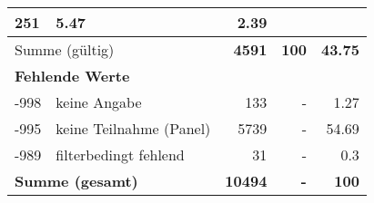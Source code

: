 \begin{longtable}{lXrrr}
       \num{251} &
       \num[round-mode=places,round-precision=2]{5,47} &
         \num[round-mode=places,round-precision=2]{2,39} \\
     \midrule
     \multicolumn{2}{l}{Summe (gültig)} &
       \textbf{\num{4591}} &
     \textbf{100} &
       \textbf{\num[round-mode=places,round-precision=2]{43,75}} \\
     \multicolumn{5}{l}{\textbf{Fehlende Werte}}\\
       -998 &
       keine Angabe &
         \num{133} &
        - &
         \num[round-mode=places,round-precision=2]{1,27} \\
       -995 &
       keine Teilnahme (Panel) &
         \num{5739} &
        - &
         \num[round-mode=places,round-precision=2]{54,69} \\
       -989 &
       filterbedingt fehlend &
         \num{31} &
        - &
         \num[round-mode=places,round-precision=2]{0,3} \\
     \midrule
     \multicolumn{2}{l}{\textbf{Summe (gesamt)}} &
          \textbf{\num{10494}} &
        \textbf{-} &
        \textbf{100} \\
     \bottomrule
     \end{longtable}
     
